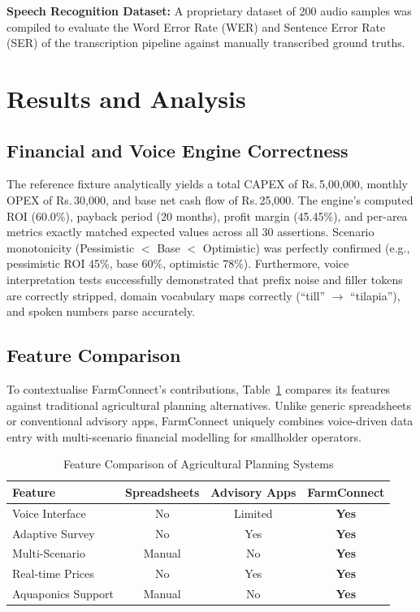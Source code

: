 \documentclass[conference]{IEEEtran}
\newcommand{\inr}[1]{Rs.\,#1}
\begin{document}
\textbf{Speech Recognition Dataset:} A proprietary dataset of 200 audio samples was compiled to evaluate the Word Error Rate (WER) and Sentence Error Rate (SER) of the transcription pipeline against manually transcribed ground truths.

\section{Results and Analysis}
\label{sec:results}

\subsection{Financial and Voice Engine Correctness}
The reference fixture analytically yields a total CAPEX of \inr{5,00,000}, monthly OPEX of \inr{30,000}, and base net cash flow of \inr{25,000}. The engine's computed ROI (60.0\%), payback period (20 months), profit margin (45.45\%), and per-area metrics exactly matched expected values across all 30 assertions. Scenario monotonicity (Pessimistic $<$ Base $<$ Optimistic) was perfectly confirmed (e.g., pessimistic ROI 45\%, base 60\%, optimistic 78\%). Furthermore, voice interpretation tests successfully demonstrated that prefix noise and filler tokens are correctly stripped, domain vocabulary maps correctly (``till'' $\to$ ``tilapia''), and spoken numbers parse accurately.

\subsection{Feature Comparison}
To contextualise FarmConnect's contributions, Table~\ref{tab:comparison} compares its features against traditional agricultural planning alternatives. Unlike generic spreadsheets or conventional advisory apps, FarmConnect uniquely combines voice-driven data entry with multi-scenario financial modelling for smallholder operators.

\begin{table}[tbp]
  \caption{Feature Comparison of Agricultural Planning Systems}
  \label{tab:comparison}
  \centering
  \small
  \setlength{\tabcolsep}{4pt}
  \begin{tabular}{lccc}
    \toprule
    \textbf{Feature} & \textbf{Spreadsheets} & \textbf{Advisory Apps} & \textbf{FarmConnect} \\
    \midrule
    Voice Interface    & No  & Limited & \textbf{Yes} \\
    Adaptive Survey    & No  & Yes     & \textbf{Yes} \\
    Multi-Scenario     & Manual & No & \textbf{Yes} \\
    Real-time Prices   & No  & Yes     & \textbf{Yes} \\
    Aquaponics Support & Manual & No & \textbf{Yes} \\
    \bottomrule
  \end{tabular}
\end{table}
\end{document}
